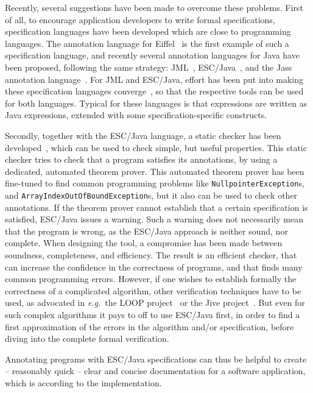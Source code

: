 \documentclass[a4paper]{llncs}
\begin{document}
Recently, several suggestions have been made to overcome these
problems. First of all, to encourage application developers to write
formal specifications, specification languages have been developed
which are close to programming languages. The annotation language for
Eiffel~\cite{Meyer97} is the first example of such a specification
language, and recently several annotation languages for Java have been
proposed, following the same strategy:
JML~\cite{LeavensBR99}, ESC/Java~\cite{ESCJavaUrl}, and
the Jass annotation language~\cite{JassUrl}. For JML and ESC/Java,
effort has been put into making these specification languages
converge~\cite{EscJmlDiff}, so that the respective tools can be used
for both languages. Typical for these languages is that
expressions are written as Java expressions, extended with some
specification-specific constructs.

Secondly, together with the ESC/Java language, a static checker has
been developed~\cite{ESCJavaUrl}, which can be used to check simple,
but useful properties. This static checker tries to check that a
program satisfies its annotations, by using a dedicated, automated
theorem prover. This automated theorem prover has been fine-tuned to
find common programming problems like
\texttt{Null\-pointer\-Exception}s, and
\texttt{Array\-Index\-Out\-Of\-Bound\-Exception}s, but it also can be
used to check other annotations. If the theorem prover cannot
establish that a certain specification is satisfied, ESC/Java issues a
warning. Such a warning does not necessarily mean that the program is
wrong, as the ESC/Java approach is neither sound, nor complete. When
designing the tool, a compromise has been made between soundness,
completeness, and efficiency. The result is an efficient checker, that
can increase the confidence in the correctness of programs, and that
finds many common programming errors. However, if one wishes to
establish formally the correctness of a complicated algorithm, other
verification techniques have to be used, as advocated in
\emph{e.g.}~the LOOP project~\cite{LOOPUrl} or the Jive
project~\cite{MeyerP00}. But even for such complex algorithms it pays
to off to use ESC/Java first, in order to find a first approximation
of the errors in the algorithm and/or specification, before diving
into the complete formal verification.

Annotating programs with ESC/Java specifications can thus be helpful
to create -- reasonably quick -- clear and concise documentation for
a software application, which is according to the implementation.
\end{document}
